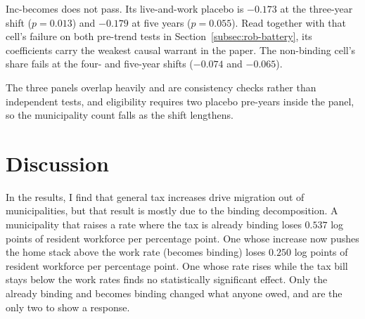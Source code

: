 \documentclass[12pt]{article}
\begin{document}
Inc-becomes does not pass. Its live-and-work placebo is
$-0.173$ at the three-year shift ($p = 0.013$) and $-0.179$ at five years
($p = 0.055$). Read together with that cell's failure on both pre-trend tests
in Section~\ref{subsec:rob-battery}, its coefficients carry the weakest
causal warrant in the paper. The non-binding cell's share fails at the four- and five-year shifts
($-0.074$ and $-0.065$).

The three panels overlap heavily and are consistency checks rather than
independent tests, and eligibility requires two placebo pre-years inside
the panel, so the municipality count falls as the shift lengthens.



\section{Discussion}
\label{sec:discussion}

In the results, I find that general tax increases drive migration out of municipalities, but that result is mostly due to the binding decomposition. A municipality that raises a rate where the tax is already binding loses $0.537$ log points of resident workforce per percentage point.
One whose increase now pushes the home stack above the work rate (becomes binding) loses
$0.250$ log points of resident workforce per percentage point. One whose rate rises while the tax bill stays below the work rates finds no statistically significant effect. Only
the already binding and becomes binding changed what anyone owed, and are the only two to show a
response.
\end{document}
